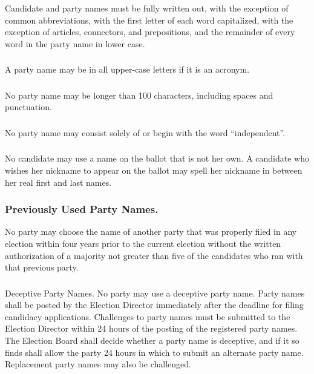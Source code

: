 \subsubsection{}
Candidate and party names must be fully written out, with the exception of common abbreviations, with the first letter of each word capitalized, with the exception of articles, connectors, and prepositions, and the remainder of every word in the party name in lower case.

\subsubsection{}
A party name may be in all upper-case letters if it is an acronym.

\subsubsection{}
No party name may be longer than 100 characters, including spaces and punctuation.

\subsubsection{}
No party name may consist solely of or begin with the word ``independent''.

\subsubsection{}
No candidate may use a name on the ballot that is not her own.  A candidate who wishes her nickname to appear on the ballot may spell her nickname in between her real first and last names.

\subsubsection{Previously Used Party Names.}
No party may choose the name of another party that was properly filed in any election within four years prior to the current election without the written authorization of a majority not greater than five of the candidates who ran with that previous party.

\subsubsection{}
Deceptive Party Names.  No party may use a deceptive party name.  
\subsubsubsection{}
Party names shall be posted by the Election Director immediately after the deadline for filing candidacy applications.  
\subsubsubsection{}
Challenges to party names must be submitted to the Election Director within 24 hours of the posting of the registered party names.  
\subsubsubsection{}
The Election Board shall decide whether a party name is deceptive, and if it so finds shall allow the party 24 hours in which to submit an alternate party name.  
\subsubsubsection{}
Replacement party names may also be challenged.

